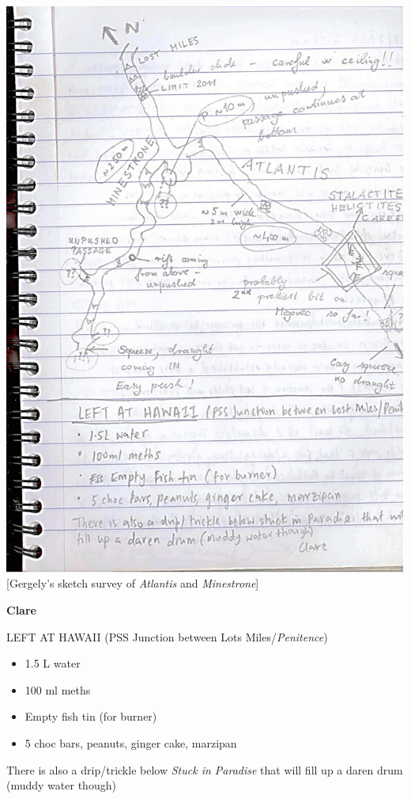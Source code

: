 \includegraphics{UgLog1012/78.jpeg}\\
{[}Gergely's sketch survey of \emph{Atlantis} and \emph{Minestrone}{]}

\textbf{Clare}

LEFT AT HAWAII (PSS Junction between Lots Miles/\emph{Penitence})

\begin{itemize}
\tightlist
\item
  1.5 L water
\item
  100 ml meths
\item
  Empty fish tin (for burner)
\item
  5 choc bars, peanuts, ginger cake, marzipan
\end{itemize}

There is also a drip/trickle below \emph{Stuck in Paradise} that will
fill up a daren drum (muddy water though)

